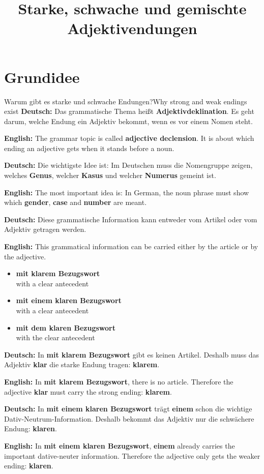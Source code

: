 \documentclass[a4paper,11pt]{article}
\title{Starke, schwache und gemischte Adjektivendungen}
\date{}
\newcommand{\GermanText}[1]{\textbf{Deutsch: }#1\par}
\newcommand{\EnglishText}[1]{{\small\color{SoftGray}\textbf{English: }#1\par}}
\newcommand{\ExampleItem}[2]{\item \textbf{#1}\\{\small\color{SoftGray}#2}}
\begin{document}
    \maketitle
    \tableofcontents
    \newpage

\section{Grundidee}

\begin{grammarentry}{Warum gibt es starke und schwache Endungen?}{Why strong and weak endings exist}
\GermanText{Das grammatische Thema heißt \textbf{Adjektivdeklination}. Es geht darum, welche Endung ein Adjektiv bekommt, wenn es vor einem Nomen steht.}
\EnglishText{The grammar topic is called \textbf{adjective declension}. It is about which ending an adjective gets when it stands before a noun.}

\GermanText{Die wichtigste Idee ist: Im Deutschen muss die Nomengruppe zeigen, welches \textbf{Genus}, welcher \textbf{Kasus} und welcher \textbf{Numerus} gemeint ist.}
\EnglishText{The most important idea is: In German, the noun phrase must show which \textbf{gender}, \textbf{case} and \textbf{number} are meant.}

\GermanText{Diese grammatische Information kann entweder vom Artikel oder vom Adjektiv getragen werden.}
\EnglishText{This grammatical information can be carried either by the article or by the adjective.}

\begin{exbox}
\begin{itemize}
    \ExampleItem{mit klarem Bezugswort}{with a clear antecedent}
    \ExampleItem{mit einem klaren Bezugswort}{with a clear antecedent}
    \ExampleItem{mit dem klaren Bezugswort}{with the clear antecedent}
\end{itemize}
\end{exbox}

\GermanText{In \textbf{mit klarem Bezugswort} gibt es keinen Artikel. Deshalb muss das Adjektiv \textbf{klar} die starke Endung tragen: \textbf{klarem}.}
\EnglishText{In \textbf{mit klarem Bezugswort}, there is no article. Therefore the adjective \textbf{klar} must carry the strong ending: \textbf{klarem}.}

\GermanText{In \textbf{mit einem klaren Bezugswort} trägt \textbf{einem} schon die wichtige Dativ-Neutrum-Information. Deshalb bekommt das Adjektiv nur die schwächere Endung: \textbf{klaren}.}
\EnglishText{In \textbf{mit einem klaren Bezugswort}, \textbf{einem} already carries the important dative-neuter information. Therefore the adjective only gets the weaker ending: \textbf{klaren}.}
\end{grammarentry}
\end{document}
